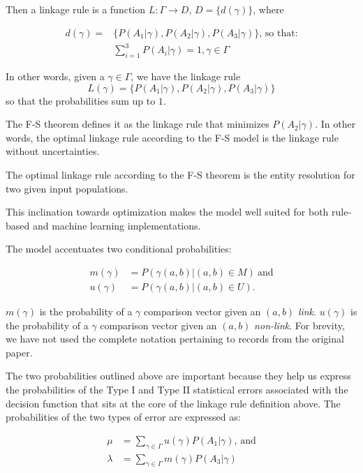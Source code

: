 Then a linkage rule is a function $L:\varGamma \rightarrow D$,
$D=\{d(\gamma)\}$, where

\begin{align}
    d(\gamma) = &\{P(A_1|\gamma),P(A_2|\gamma),P(A_3|\gamma)\}\textrm{, so
    that:}\nonumber\\
    &\sum_{i=1}^{3}P(A_i|\gamma) = 1\nonumber, \gamma \in \varGamma\nonumber
\end{align}

In other words, given a $\gamma \in \varGamma$, we have the linkage rule
\[
    L(\gamma) = \{P(A_1|\gamma), P(A_2|\gamma), P(A_3|\gamma)\}
\]
so that the probabilities sum up to $1$.

The F-S theorem defines it as the linkage rule that minimizes
$P(A_2|\gamma)$.
In other words, the optimal linkage rule according to the F-S model is the
linkage rule without uncertainties.

\begin{defn}
    The optimal linkage rule according to the F-S theorem is the entity
    resolution for two given input populations.
\end{defn}


This inclination towards optimization makes the model well suited for both
rule-based\cite{oyster2012} and machine learning\cite{deepm2020}
implementations.

The model accentuates two conditional probabilities:

\begin{align}
    m(\gamma)&=P(\gamma(a, b) | (a, b) \in M)~\textrm{and}\nonumber\\
    u(\gamma)&=P(\gamma(a, b) | (a, b) \in U)\textrm{.}\nonumber
\end{align}

\noindent
$m(\gamma)$ is the probability of a $\gamma$ comparison vector given an
$(a, b)$ \textit{link}.
$u(\gamma)$ is the probability of a $\gamma$ comparison vector given an
$(a, b)$ \textit{non-link}.
For brevity, we have not used the complete notation pertaining to records
from the original paper.

The two probabilities outlined above are important because they help us
express the probabilities of the Type I and Type II statistical errors
associated with the decision function that sits at the core of the linkage
rule definition above.
The probabilities of the two types of error are expressed as:

\begin{align}
    \mu&=\sum_{\gamma \in \varGamma}u(\gamma)P(A_1|\gamma)\textrm{,~and}\nonumber\\
    \lambda&=\sum_{\gamma \in \varGamma}m(\gamma)P(A_3|\gamma)\nonumber
\end{align}

